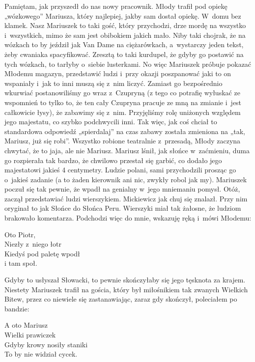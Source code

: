 Pamiętam, jak przyszedł do nas nowy pracownik. Młody trafił pod opiekę „wózkowego” Mariusza, który najlepiej, jakby sam dostał opiekę. W~domu bez klamek. Nasz Mariuszek to taki gość, który przychodzi, drze mordę na wszystko i~wszystkich, mimo że sam jest obibokiem jakich mało. Niby taki chojrak, że na wózkach to by jeździł jak Van Dame na ciężarówkach, a~wystarczy jeden tekst, żeby cwaniaka spacyfikować. Zresztą to taki kurdupel, że gdyby go postawić na tych wózkach, to tarłyby o~siebie lusterkami. No więc Mariuszek próbuje pokazać Młodemu magazyn, przedstawić ludzi i~przy okazji poszpanować jaki to on wspaniały i~jak to inni muszą się z~nim liczyć. Zamiast go bezpośrednio wkurwiać postanowiliśmy go wraz z~Czupryną (z tego co potrafię wyłuskać ze wspomnień to tylko to, że ten cały Czupryna pracuje ze mną na zmianie i~jest całkowicie łysy), że zabawimy się z~nim. Przyjęliśmy rolę uniżonych względem jego majestatu, co szybko podchwycili inni. Tak więc, jak coś chciał to standardowa odpowiedź „spierdalaj” na czas zabawy została zmieniona na „tak, Mariusz, już się robi”. Wszystko robione teatralnie z~przesadą, Młody zaczyna chwytać, że to jaja, ale nie Mariusz. Mariusz lśnił, jak słońce w~zaćmieniu, duma go rozpierała tak bardzo, że chwilowo przestał się garbić, co dodało jego majestatowi jakieś 4 centymetry. Ludzie polani, sami przychodzili prosząc go o~jakieś zadanie (a to żaden kierownik ani nic, zwykły robol jak my). Mariuszek poczuł się tak pewnie, że wpadł na genialny w~jego mniemaniu pomysł. Otóż, zaczął przedstawiać ludzi wierszykiem. Mickiewicz jak chuj się znalazł. Przy nim oryginał to jak Słońce do Słońca Peru. Wierszyki miał tak żałosne, że ludziom brakowało komentarza. Podchodzi więc do mnie, wskazuję ręką i~mówi Młodemu:

\begin{itquote}
Oto Piotr,\\
Niezły z~niego łotr\\
Kiedyś pod paletę wpodł\\
i tam społ.\\
\end{itquote}

Gdyby to usłyszał Słowacki, to pewnie skończyłaby się jego tęsknota za krajem. Niestety Mariuszek trafił na gościa, który był miłośnikiem tak zwanych Wielkich Bitew, przez co niewiele się zastanawiając, zaraz gdy skończył, poleciałem po bandzie:

\begin{itquote}
A oto Mariusz\\
Wielki prawiczek\\
Gdyby krowy nosiły staniki\\
To by nie widział cycek.\\
\end{itquote}

